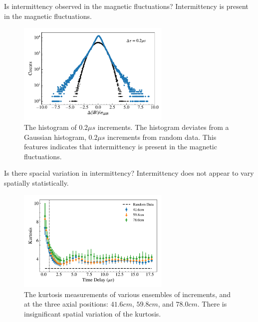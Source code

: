 \documentclass[%
 aip,
 amsmath,amssymb,
preprint,%
]{revtex4-1}
\begin{document}
Is intermittency observed in the magnetic fluctuations?
Intermittency is present in the magnetic fluctuations.\\

\begin{figure}
\includegraphics[width=0.65\textwidth]{Figures/Intermittency_figs/new_avg_incr_hist_counts_0.2us_with_rand_p5.pdf}%
\caption{\label{fig:intermit_0.2} The histogram of $0.2\mu s$ increments. The histogram deviates from a Gaussian histogram, $0.2\mu s$ increments from random data. This features indicates that intermittency is present in the magnetic fluctuations.}
\end{figure}


Is there spacial variation in intermittency?
Intermittency does not appear to vary spatially statistically.\\

\begin{figure}
\includegraphics[width=0.65\textwidth]{Figures/Intermittency_figs/ensem_merge_kurt_10shot_range_all_with_rand_tscales.pdf}%
\caption{\label{fig:kurtosis} The kurtosis measurements of various ensembles of increments, and at the three axial positions: $41.6cm$, $59.8cm$, and $78.0cm$. There is insignificant spatial variation of the kurtosis.}
\end{figure}
\end{document}

